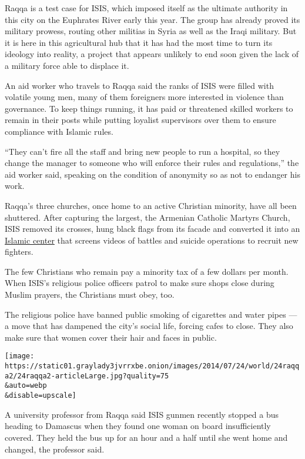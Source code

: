 Raqqa is a test case for ISIS, which imposed itself as the ultimate
authority in this city on the Euphrates River early this year. The group
has already proved its military prowess, routing other militias in Syria
as well as the Iraqi military. But it is here in this agricultural hub
that it has had the most time to turn its ideology into reality, a
project that appears unlikely to end soon given the lack of a military
force able to displace it.

An aid worker who travels to Raqqa said the ranks of ISIS were filled
with volatile young men, many of them foreigners more interested in
violence than governance. To keep things running, it has paid or
threatened skilled workers to remain in their posts while putting
loyalist supervisors over them to ensure compliance with Islamic rules.

``They can't fire all the staff and bring new people to run a hospital,
so they change the manager to someone who will enforce their rules and
regulations,'' the aid worker said, speaking on the condition of
anonymity so as not to endanger his work.

Raqqa's three churches, once home to an active Christian minority, have
all been shuttered. After capturing the largest, the Armenian Catholic
Martyrs Church, ISIS removed its crosses, hung black flags from its
facade and converted it into an
\href{http://www.alquds.co.uk/wp-content/uploads/picdata/2013/12/12-03/03qpt963.jpg}{Islamic
center} that screens videos of battles and suicide operations to recruit
new fighters.

The few Christians who remain pay a minority tax of a few dollars per
month. When ISIS's religious police officers patrol to make sure shops
close during Muslim prayers, the Christians must obey, too.

The religious police have banned public smoking of cigarettes and water
pipes --- a move that has dampened the city's social life, forcing cafes
to close. They also make sure that women cover their hair and faces in
public.

\texttt{[image: https://static01.graylady3jvrrxbe.onion/images/2014/07/24/world/24raqqa2/24raqqa2-articleLarge.jpg?quality=75\\\&auto=webp\\\&disable=upscale]}

A university professor from Raqqa said ISIS gunmen recently stopped a
bus heading to Damascus when they found one woman on board
insufficiently covered. They held the bus up for an hour and a half
until she went home and changed, the professor said.

